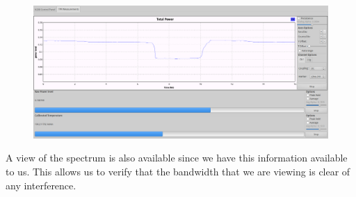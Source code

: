 {\begin{figure}[h!tb] 
\centering
\includegraphics[width=17cm]{Images/Lab1_TPR_at_end_exp.png}
\label{radiometer_tpr_display}
\end{figure}
}

A view of the spectrum is also available since we have this information available to us.  This allows us to verify that the bandwidth that we are viewing is clear of any interference.  


